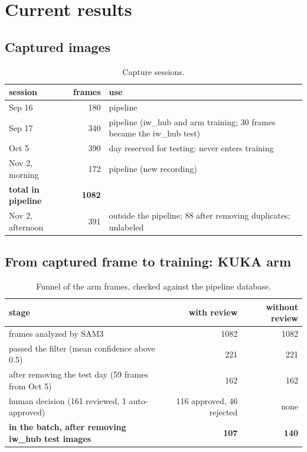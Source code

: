 \documentclass[11pt,a4paper]{article}
\begin{document}
\section{Current results}

\subsection{Captured images}

\begin{table}[H]
\centering\small
\caption{Capture sessions.}
\begin{tabular}{lrp{9.5cm}}
\toprule
session & frames & use \\
\midrule
Sep 16 & 180 & pipeline \\
Sep 17 & 340 & pipeline (iw\_hub and arm training; 30 frames became the iw\_hub test) \\
Oct 5 & 390 & day reserved for testing: never enters training \\
Nov 2, morning & 172 & pipeline (new recording) \\
\textbf{total in pipeline} & \textbf{1082} & \\
Nov 2, afternoon & 391 & outside the pipeline; 88 after removing duplicates; unlabeled \\
\bottomrule
\end{tabular}
\end{table}

\subsection{From captured frame to training: KUKA arm}

\begin{table}[H]
\centering\small
\caption{Funnel of the arm frames, checked against the pipeline database.}
\label{tab:funnel}
\begin{tabular}{p{7cm}rr}
\toprule
stage & with review & without review \\
\midrule
frames analyzed by SAM3 & 1082 & 1082 \\
passed the filter (mean confidence above 0.5) & 221 & 221 \\
after removing the test day (59 frames from Oct 5) & 162 & 162 \\
human decision (161 reviewed, 1 auto-approved) & 116 approved, 46 rejected & none \\
\textbf{in the batch, after removing iw\_hub test images} & \textbf{107} & \textbf{140} \\
\bottomrule
\end{tabular}
\end{table}
\end{document}
